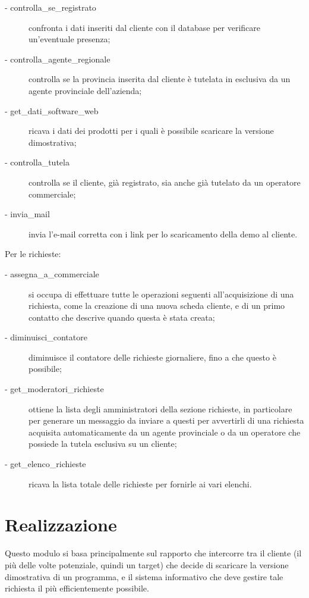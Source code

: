 \begin{description}
\item[- controlla\_{}se\_{}registrato] confronta i dati inseriti dal cliente con il database per verificare un'eventuale presenza;
\item[- controlla\_{}agente\_{}regionale] controlla se la provincia inserita dal cliente \`e tutelata in esclusiva da un agente provinciale dell'azienda;
\item[- get\_{}dati\_{}software\_{}web] ricava i dati dei prodotti per i quali \`e possibile scaricare la versione dimostrativa;
\item[- controlla\_{}tutela] controlla se il cliente, gi\`a registrato, sia anche gi\`a tutelato da un operatore commerciale;
\item[- invia\_{}mail] invia l'e-mail corretta con i link per lo scaricamento della demo al cliente.
\end{description}
\noindent
Per le richieste:
\begin{description}
\item[- assegna\_{}a\_{}commerciale] si occupa di effettuare tutte le operazioni seguenti all'acquisizione di una richiesta, come la creazione di una nuova scheda cliente, e di un primo contatto che descrive quando questa \`e stata creata;
\item[- diminuisci\_{}contatore] diminuisce il contatore delle richieste giornaliere, fino a che questo \`e possibile;
\item[- get\_{}moderatori\_{}richieste] ottiene la lista degli amministratori della sezione richieste, in particolare per generare un messaggio da inviare a questi per avvertirli di una richiesta acquisita automaticamente da un agente provinciale o da un operatore che possiede la tutela esclusiva su un cliente;
\item[- get\_{}elenco\_{}richieste] ricava la lista totale delle richieste per fornirle ai vari elenchi.
\end{description}


\newpage
\section{Realizzazione}
Questo modulo si basa principalmente sul rapporto che intercorre tra il cliente (il pi\`u delle volte potenziale, quindi un target) che decide di scaricare la versione dimostrativa di un programma, e il sistema informativo che deve gestire tale richiesta il pi\`u efficientemente possibile.

